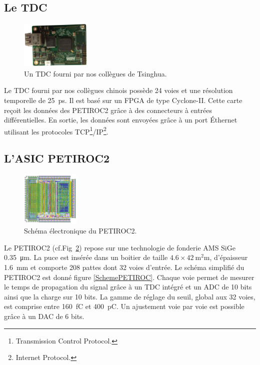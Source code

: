\subsection{Le TDC}
\begin{figure}
	\vspace*{-1cm}
	\centering
	\includegraphics[width=0.30\textwidth]{ELE/TDC.png}
	\caption{Un TDC fourni par nos collègues de Tsinghua.}
	\label{tdc}
\end{figure}
Le TDC fourni par nos collègues chinois possède \num{24} voies et une résolution temporelle de \SI{25}{\pico\second}. Il est basé sur un FPGA de type Cyclone-II. Cette carte reçoit les données des PETIROC2 grâce à des connecteurs à entrées différentielles. En sortie, les données sont envoyées grâce à un port Éthernet utilisant les protocoles TCP\footnote{Transmission Control Protocol.}/IP\footnote{Internet Protocol.}.

\subsection{L'ASIC PETIROC2}

\begin{figure}
	\centering
	\vspace*{-1cm}
	\includegraphics[width=0.25\textwidth]{ELE/PETIROC.png}
	\caption{Schéma électronique du PETIROC2.}
	\label{PETIROC2}
\end{figure}

Le PETIROC2 (cf.Fig~\ref{PETIROC2}) repose sur une technologie de fonderie AMS SiGe \SI{0.35}{\micro\meter}. La puce est insérée dans un boitier de taille $\num{4.6}\times\SI{42}{\square\milli\meter}$, d'épaisseur \SI{1.6}{\milli\meter} et comporte \num{208} pattes dont \num{32} voies d'entrée. Le schéma simplifié du PETIROC2 est donné figure \ref{SchemePETIROC}. Chaque voie permet de mesurer le temps de propagation du signal grâce à un TDC intégré et un ADC de \num{10} bits ainsi que la charge sur \num{10} bits. La gamme de réglage du seuil, global aux \num{32} voies, est comprise entre \SI{160}{\femto\coulomb} et \SI{400}{\pico\coulomb}. Un ajustement voie par voie est possible grâce à un DAC de \num{6} bits. 

